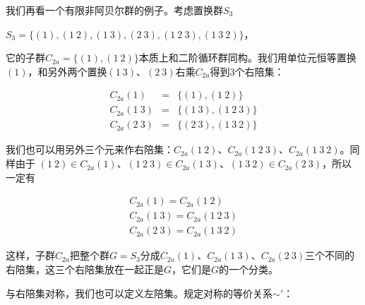 \documentclass[b5paper]{ctexart}
\begin{document}

我们再看一个有限非阿贝尔群的例子。考虑置换群$S_3$

$S_3 = \{(1), (1\ 2), (1\ 3), (2\ 3), (1\ 2\ 3), (1\ 3\ 2)\}$，

它的子群$C_{2a} = \{(1), (1\ 2)\}$本质上和二阶循环群同构。我们用单位元恒等置换$(1)$，和另外两个置换$(1\ 3)$、$(2\ 3)$右乘$C_{2a}$得到3个右陪集：

\[
\begin{array}{rcl}
C_{2a} (1) & = & \{(1), (1\ 2)\} \\
C_{2a} (1\ 3) & = & \{(1\ 3), (1\ 2\ 3)\} \\
C_{2a} (2\ 3) & = & \{(2\ 3), (1\ 3\ 2)\}
\end{array}
\]

我们也可以用另外三个元来作右陪集：$C_{2a} (1\ 2)$、$C_{2a} (1\ 2\ 3)$、$C_{2a} (1\ 3\ 2)$。同样由于
$(1\ 2) \in C_{2a} (1)$、$(1\ 2\ 3) \in C_{2a} (1\ 3)$、$(1\ 3\ 2) \in C_{2a} (2\ 3)$，所以一定有

\[
\begin{array}{l}
C_{2a} (1) = C_{2a} (1\ 2) \\
C_{2a} (1\ 3) = C_{2a} (1\ 2\ 3) \\
C_{2a} (2\ 3) = C_{2a} (1\ 3\ 2)
\end{array}
\]

这样，子群$C_{2a}$把整个群$G = S_3$分成$C_{2a} (1)$、$ C_{2a} (1\ 3)$、$C_{2a} (2\ 3)$三个不同的右陪集，这三个右陪集放在一起正是$G$，它们是$G$的一个分类。

与右陪集对称，我们也可以定义左陪集。规定对称的等价关系$\sim'$：
\end{document}
